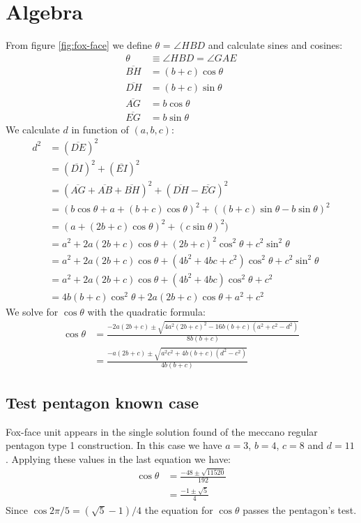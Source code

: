 \documentclass[11pt]{article}
\begin{document}
\section{Algebra}
From figure \ref{fig:fox-face} we define $\theta$ = $\angle{HBD}$ and calculate sines and cosines:
\begin{align}
\theta &\equiv \angle{HBD} = \angle{GAE}\\
\overline{BH} &= (b+c)\cos{\theta}\\
\overline{DH} &= (b+c)\sin{\theta}\\
\overline{AG} &= b\cos{\theta}\\
\overline{EG} &= b\sin{\theta}
\end{align}
We calculate $d$ in function of $(a,b,c)$:
\begin{align}
d^2 &= (\overline{DE})^2 \nonumber\\
 &= (\overline{DI})^2 + (\overline{EI})^2 \nonumber\\
 &= (\overline{AG} + \overline{AB} + \overline{BH})^2 + (\overline{DH} - \overline{EG})^2\\
 &= (b\cos{\theta} + a + (b+c)\cos{\theta})^2 + ((b+c)\sin{\theta} - b\sin{\theta})^2\\
 &= (a + (2b+c)\cos{\theta})^2 + (c\sin{\theta})^2)\nonumber\\
 &= a^2 + 2a(2b+c)\cos{\theta} + (2b+c)^2\cos^2{\theta} + c^2\sin^2{\theta}\nonumber\\
 &= a^2 + 2a(2b+c)\cos{\theta} + (4b^2 + 4bc + c^2)\cos^2{\theta} + c^2\sin^2{\theta}\nonumber\\
 &= a^2 + 2a(2b+c)\cos{\theta} + (4b^2 + 4bc)\cos^2{\theta} + c^2\nonumber\\
 &= 4b(b + c)\cos^2{\theta} + 2a(2b+c)\cos{\theta} + a^2 + c^2
\end{align}
We solve for $\cos{\theta}$ with the quadratic formula:
\begin{align}
\cos{\theta} &= \frac{-2a(2b+c) \pm \sqrt{4a^2(2b+c)^2 - 16b(b+c)(a^2 + c^2 - d^2)}}{8b(b+c)} \nonumber\\
 &= \frac{-a(2b+c) \pm \sqrt{a^2c^2 + 4b(b+c)(d^2-c^2)}}{4b(b+c)}
\end{align}

\subsection{Test pentagon known case}
Fox-face unit appears in the single solution found of the meccano regular pentagon type 1 construction.
In this case we have $a=3$, $b=4$, $c=8$ and $d=11$. Applying these values in the last equation we have:
\begin{align}
\cos{\theta} &= \frac{-48 \pm \sqrt{11520}}{192} \nonumber\\
 &= \frac{-1 \pm \sqrt{5}}{4}
\end{align}
Since $\cos{2\pi/5} = (\sqrt{5} - 1)/4$ the equation for $\cos{\theta}$ passes the pentagon's test.
\end{document}
